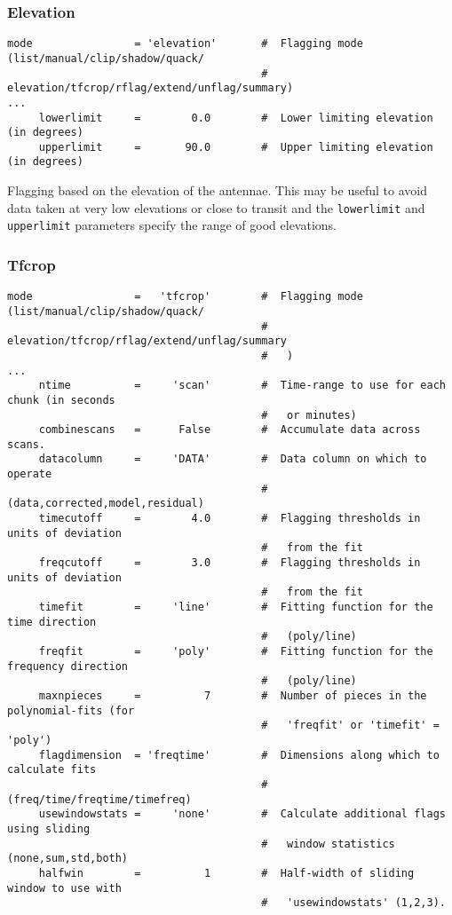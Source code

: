 \subsubsection{Elevation}
\label{section:edit.flagdata.mode.elevation}

\small
\begin{verbatim}
mode                = 'elevation'       #  Flagging mode (list/manual/clip/shadow/quack/
                                        #   elevation/tfcrop/rflag/extend/unflag/summary)
...
     lowerlimit     =        0.0        #  Lower limiting elevation (in degrees)
     upperlimit     =       90.0        #  Upper limiting elevation (in degrees)
\end{verbatim}
\normalsize

Flagging based on the elevation of the antennae. This may be useful to
avoid data taken at very low elevations or close to transit and the
{\tt lowerlimit} and {\tt upperlimit} parameters specify the range of
good elevations.


\subsubsection{Tfcrop}
\label{section:edit.flagdata.mode.tfcrop}

\small
\begin{verbatim}
mode                =   'tfcrop'        #  Flagging mode (list/manual/clip/shadow/quack/
                                        #   elevation/tfcrop/rflag/extend/unflag/summary
                                        #   )
...
     ntime          =     'scan'        #  Time-range to use for each chunk (in seconds
                                        #   or minutes)
     combinescans   =      False        #  Accumulate data across scans.
     datacolumn     =     'DATA'        #  Data column on which to operate
                                        #   (data,corrected,model,residual)
     timecutoff     =        4.0        #  Flagging thresholds in units of deviation
                                        #   from the fit
     freqcutoff     =        3.0        #  Flagging thresholds in units of deviation
                                        #   from the fit
     timefit        =     'line'        #  Fitting function for the time direction
                                        #   (poly/line)
     freqfit        =     'poly'        #  Fitting function for the frequency direction
                                        #   (poly/line)
     maxnpieces     =          7        #  Number of pieces in the polynomial-fits (for
                                        #   'freqfit' or 'timefit' = 'poly')
     flagdimension  = 'freqtime'        #  Dimensions along which to calculate fits
                                        #   (freq/time/freqtime/timefreq)
     usewindowstats =     'none'        #  Calculate additional flags using sliding
                                        #   window statistics (none,sum,std,both)
     halfwin        =          1        #  Half-width of sliding window to use with
                                        #   'usewindowstats' (1,2,3).
\end{verbatim}
\normalsize

